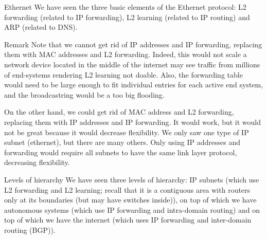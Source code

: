 \documentclass[a4paper]{article}
\begin{document}
\begin{parag}{Ethernet}
    We have seen the three basic elements of the Ethernet protocol: L2 forwarding (related to IP forwarding), L2 learning (related to IP routing) and ARP (related to DNS).
\end{parag}

\begin{parag}{Remark}
    Note that we cannot get rid of IP addresses and IP forwarding, replacing them with MAC addresses and L2 forwarding. Indeed, this would not scale a network device located in the middle of the internet may see traffic from millions of end-systems rendering L2 learning not doable. Also, the forwarding table would need to be large enough to fit individual entries for each active end system, and the broadcastring would be a too big flooding.

    On the other hand, we could get rid of MAC address and L2 forwarding, replacing them with IP addresses and IP forwarding. It would work, but it would not be great because it would decrease flexibility. We only saw one type of IP subnet (ethernet), but there are many others. Only using IP addresses and forwarding would require all subnets to have the same link layer protocol, decreasing flexibility.
\end{parag}

\begin{parag}{Levels of hierarchy}
    We have seen three levels of hierarchy: IP subnets (which use L2 forwarding and L2 learning; recall that it is a contiguous area with routers only at its boundaries (but may have switches inside)), on top of which we have autonomous systems (which use IP forwarding and intra-domain routing) and on top of which we have the internet (which uses IP forwarding and inter-domain routing (BGP)).
\end{parag}
\end{document}
